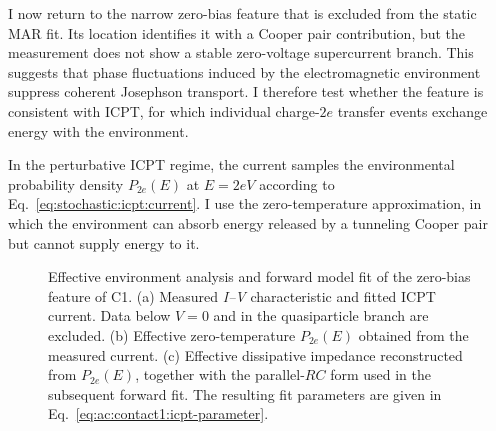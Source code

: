         I now return to the narrow zero-bias feature that is excluded from the static MAR fit. Its location identifies it with a Cooper pair contribution, but the measurement does not show a stable zero-voltage supercurrent branch. This suggests that phase fluctuations induced by the electromagnetic environment suppress coherent Josephson transport. I therefore test whether the feature is consistent with ICPT, for which individual charge-$2e$ transfer events exchange energy with the environment.

        In the perturbative ICPT regime, the current samples the environmental probability density $P_{2e}(E)$ at $E=2eV$ according to Eq.~\eqref{eq:stochastic:icpt:current}. I use the zero-temperature approximation, in which the environment can absorb energy released by a tunneling Cooper pair but cannot supply energy to it.

        \begin{figure}
            \centering
            \hfill
            \hfill
            \caption{Effective environment analysis and forward model fit of the zero-bias feature of C1. (a) Measured \textit{I--V} characteristic and fitted ICPT current. Data below $V=0$ and in the quasiparticle branch are excluded. (b) Effective zero-temperature $P_{2e}(E)$ obtained from the measured current. (c) Effective dissipative impedance reconstructed from $P_{2e}(E)$, together with the parallel-$RC$ form used in the subsequent forward fit. The resulting fit parameters are given in Eq.~\eqref{eq:ac:contact1:icpt-parameter}.}
            \label{fig:ac:contact1:supercurrent}
        \end{figure}

